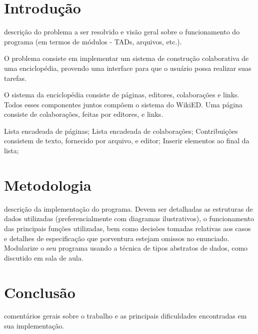 \documentclass[
	12pt,
	oneside,
	a4paper,
	english,
	french,
	spanish,
	brazil,
	]{abntex2}
\begin{document}
\frenchspacing

\imprimircapa

\textual

\chapter{Introdução}
descrição do problema a ser resolvido e visão geral sobre o funcionamento do
programa (em termos de módulos - TADs, arquivos, etc.).

O problema consiste em implementar um sistema de construção colaborativa de uma
enciclopédia, provendo uma interface para que o usuário possa realizar suas
tarefas.

O sistema da enciclopédia consiste de páginas, editores, colaborações e links.
Todos esses componentes juntos compõem o sistema do WikiED. Uma página consiste
de colaborações, feitas por editores, e links.

Lista encadeada de páginas;
Lista encadeada de colaborações;
Contribuições consistem de texto, fornecido por arquivo, e editor;
Inserir elementos ao final da lista;

\chapter{Metodologia}
descrição da implementação do programa. Devem ser detalhadas as estruturas de
dados utilizadas (preferencialmente com diagramas ilustrativos), o
funcionamento das principais funções utilizadas, bem como decisões tomadas
relativas aos casos e detalhes de especificação que porventura estejam omissos
no enunciado. Modularize o seu programa usando a técnica de tipos abstratos de
dados, como discutido em sala de aula.

\chapter{Conclusão}
comentários gerais sobre o trabalho e as principais dificuldades encontradas em
sua implementação.



\end{document}
